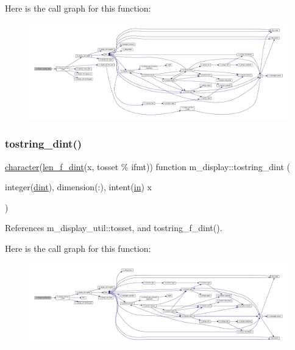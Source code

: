 Here is the call graph for this function\+:
\nopagebreak
\begin{figure}[H]
\begin{center}
\leavevmode
\includegraphics[width=350pt]{namespacem__display_a0b5ebf70cd08a5bffc132707049bcef6_cgraph}
\end{center}
\end{figure}
\mbox{\label{namespacem__display_a5a8479cdf49ed905e9c54cc2f86cea16}} 
\subsubsection{\texorpdfstring{tostring\+\_\+dint()}{tostring\_dint()}}
{\footnotesize\ttfamily \hyperlink{option__stopwatch_83_8txt_abd4b21fbbd175834027b5224bfe97e66}{character}(\hyperlink{namespacem__display_a6a2709cf5f243ee492f223b40c6b5143}{len\+\_\+f\+\_\+dint}(x, tosset \% ifmt)) function m\+\_\+display\+::tostring\+\_\+dint (\begin{DoxyParamCaption}\item[{integer(\hyperlink{namespacem__display_a73f772e9702cad6f40b78364fde2c7cd}{dint}), dimension(\+:), intent(\hyperlink{M__journal_83_8txt_afce72651d1eed785a2132bee863b2f38}{in})}]{x }\end{DoxyParamCaption})\hspace{0.3cm}{\ttfamily [private]}}



References m\+\_\+display\+\_\+util\+::tosset, and tostring\+\_\+f\+\_\+dint().

Here is the call graph for this function\+:
\nopagebreak
\begin{figure}[H]
\begin{center}
\leavevmode
\includegraphics[width=350pt]{namespacem__display_a5a8479cdf49ed905e9c54cc2f86cea16_cgraph}
\end{center}
\end{figure}
\mbox{\label{namespacem__display_ac4b7da9242ea26fd744e1301444d374a}} 
